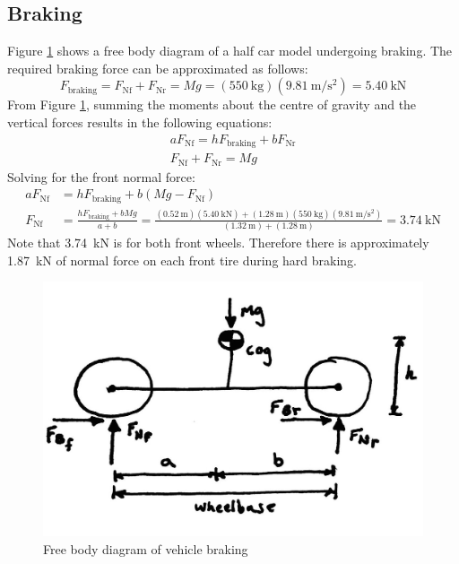 \documentclass[10pt]{article}
\begin{document}
\subsection{Braking}
Figure \ref{fig:braking-fbd} shows a free body diagram of a half car model undergoing braking. The required braking force can be approximated as follows: 
\begin{equation}
F_\mathrm{braking} = F_\mathrm{Nf} + F_\mathrm{Nr} = Mg = (\SI{550}{\kilo\gram})(\SI{9.81}{\metre\per\second\squared}) = \SI{5.40}{\kilo\newton}
\end{equation}
From Figure \ref{fig:braking-fbd}, summing the moments about the centre of gravity and the vertical forces results in the following equations: 
\begin{gather}
aF_\mathrm{Nf} = hF_\mathrm{braking} + bF_\mathrm{Nr} \\
F_\mathrm{Nf} + F_\mathrm{Nr} = Mg
\end{gather}
Solving for the front normal force: 
\begin{equation}
\begin{split}
aF_\mathrm{Nf} &= hF_\mathrm{braking} + b(Mg - F_\mathrm{Nf})\\
F_\mathrm{Nf} &= \frac{hF_\mathrm{braking} + bMg}{a+b} = \frac{(\SI{0.52}{\metre})(\SI{5.40}{\kilo\newton})+(\SI{1.28}{\metre})(\SI{550}{\kilo\gram})(\SI{9.81}{\metre\per\second\squared})}{(\SI{1.32}{\metre})+(\SI{1.28}{\metre})} = \SI{3.74}{\kilo\newton}
\end{split}
\end{equation}
Note that \SI{3.74}{\kilo\newton} is for both front wheels. Therefore there is approximately \SI{1.87}{\kilo\newton} of normal force on each front tire during hard braking. 

\begin{figure}[hbp]
\centering
\includegraphics[width=.5\textwidth]{figures/braking-fbd}
\caption{Free body diagram of vehicle braking}
\label{fig:braking-fbd}
\end{figure}
\end{document}
